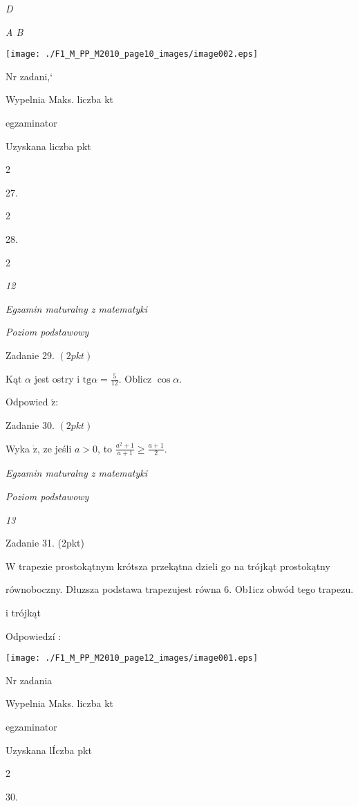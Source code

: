 \documentclass[a4paper,12pt]{article}
\begin{document}
{\it D}

{\it A  B}
\begin{center}
\texttt{[image: ./F1\_M\_PP\_M2010\_page10\_images/image002.eps]}
\end{center}
Nr zadani,`

Wypelnia Maks. liczba kt

egzaminator

Uzyskana liczba pkt

2

27.

2

28.

2





{\it 12}

{\it Egzamin maturalny z matematyki}

{\it Poziom podstawowy}

Zadanie 29. $(2pkt)$

Kąt $\alpha$ jest ostry i $\displaystyle \mathrm{t}\mathrm{g}\alpha=\frac{5}{12}$. Oblicz $\cos\alpha.$

Odpowied $\acute{\mathrm{z}}$:

Zadanie 30. $(2pkt)$

Wyka $\dot{\mathrm{z}}$, ze jeśli $a>0$, to $\displaystyle \frac{a^{2}+1}{a+1}\geq\frac{a+1}{2}.$





{\it Egzamin maturalny z matematyki}

{\it Poziom podstawowy}

{\it 13}

Zadanie 31. (2pkt)

W trapezie prostokątnym krótsza przekątna dzieli go na trójkąt prostokątny

równoboczny. Dłuzsza podstawa trapezujest równa 6. Ob1icz obwód tego trapezu.

i trójkąt

Odpowiedzí :
\begin{center}
\texttt{[image: ./F1\_M\_PP\_M2010\_page12\_images/image001.eps]}
\end{center}
Nr zadania

Wypelnia Maks. liczba kt

egzaminator

Uzyskana lÍczba pkt

2

30.
\end{document}
